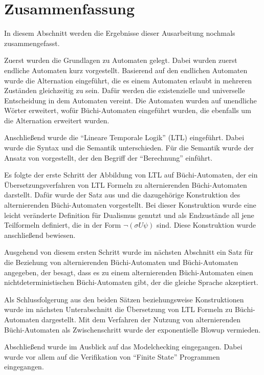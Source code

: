\section{Zusammenfassung}

In diesem Abschnitt werden die Ergebnisse dieser Ausarbeitung nochmals zusammengefasst.

Zuerst wurden die Grundlagen zu Automaten gelegt. Dabei wurden zuerst endliche Automaten kurz vorgestellt. Basierend auf den endlichen Automaten wurde die Alternation eingeführt, die es einem Automaten erlaubt in mehreren Zuständen gleichzeitig zu sein. Dafür werden die existenzielle und universelle Entscheidung in dem Automaten vereint. Die Automaten wurden auf unendliche Wörter erweitert, wofür Büchi-Automaten eingeführt wurden, die ebenfalls um die Alternation erweitert wurden.

Anschließend wurde die "`Lineare Temporale Logik"' (LTL) eingeführt. Dabei wurde die Syntax und die Semantik unterschieden. Für die Semantik wurde der Ansatz von \cite{vardi+96} vorgestellt, der den Begriff der "`Berechnung"' einführt.

Es folgte der erste Schritt der Abbildung von LTL auf Büchi-Automaten, der ein Übersetzungsverfahren von LTL Formeln zu alternierenden Büchi-Automaten darstellt. Dafür wurde der Satz aus \cite{vardi+96} und die dazugehörige Konstruktion des alternierenden Büchi-Automaten vorgestellt. Bei dieser Konstruktion wurde eine leicht veränderte Definition für Dualismus genutzt und als Endzustände all jene Teilformeln definiert, die in der Form $\lnot(\sigma U\psi)$ sind. Diese Konstruktion wurde anschließend bewiesen.

Ausgehend von diesem ersten Schritt wurde im nächsten Abschnitt ein Satz für die Beziehung von alternierenden Büchi-Automaten und Büchi-Automaten angegeben, der besagt, dass es zu einem alternierenden Büchi-Automaten einen nichtdeterministischen Büchi-Automaten gibt, der die gleiche Sprache akzeptiert.

Als Schlussfolgerung aus den beiden Sätzen beziehungsweise Konstruktionen wurde im nächsten Unterabschnitt die Übersetzung von LTL Formeln zu Büchi-Automaten dargestellt. Mit dem Verfahren der Nutzung von alternierenden Büchi-Automaten als Zwischenschritt wurde der exponentielle Blowup vermieden.

Abschließend wurde im Ausblick auf das Modelchecking eingegangen. Dabei wurde vor allem auf die Verifikation von "`Finite State"' Programmen eingegangen. 